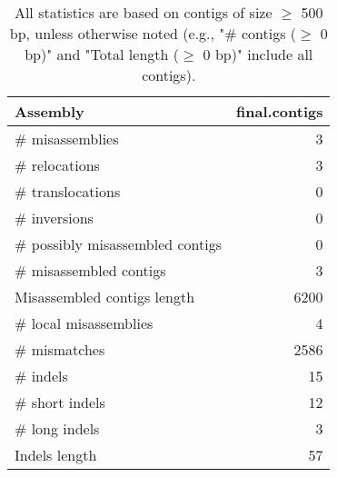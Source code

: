 \documentclass[12pt,a4paper]{article}
\begin{document}
\begin{table}[ht]
\begin{center}
\caption{All statistics are based on contigs of size $\geq$ 500 bp, unless otherwise noted (e.g., "\# contigs ($\geq$ 0 bp)" and "Total length ($\geq$ 0 bp)" include all contigs).}
\begin{tabular}{|l*{1}{|r}|}
\hline
Assembly & final.contigs \\ \hline
\# misassemblies & 3 \\ \hline
\hspace{5mm}\# relocations & 3 \\ \hline
\hspace{5mm}\# translocations & 0 \\ \hline
\hspace{5mm}\# inversions & 0 \\ \hline
\# possibly misassembled contigs & 0 \\ \hline
\# misassembled contigs & 3 \\ \hline
Misassembled contigs length & 6200 \\ \hline
\# local misassemblies & 4 \\ \hline
\# mismatches & 2586 \\ \hline
\# indels & 15 \\ \hline
\hspace{5mm}\# short indels & 12 \\ \hline
\hspace{5mm}\# long indels & 3 \\ \hline
Indels length & 57 \\ \hline
\end{tabular}
\end{center}
\end{table}
\end{document}
